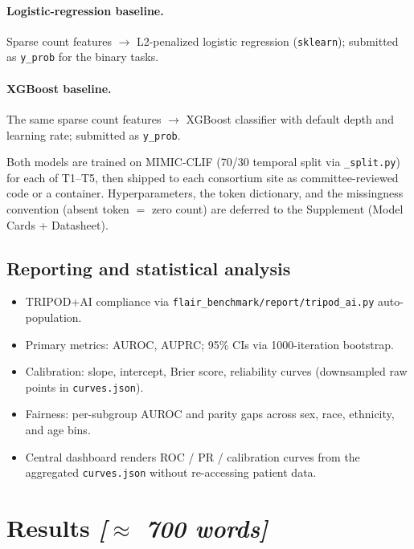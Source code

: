 \documentclass[11pt]{article}
\newcommand{\note}[1]{{\color{notecolor}\textit{[#1]}}}
\begin{document}
\paragraph{Logistic-regression baseline.} Sparse count features $\to$
L2-penalized logistic regression (\texttt{sklearn}); submitted as
\texttt{y\_prob} for the binary tasks.

\paragraph{XGBoost baseline.} The same sparse count features $\to$
XGBoost classifier with default depth and learning rate; submitted as
\texttt{y\_prob}.

Both models are trained on MIMIC-CLIF (70/30 temporal split via
\texttt{\_split.py}) for each of T1--T5, then shipped to each consortium
site as committee-reviewed code or a container. Hyperparameters, the token dictionary, and the missingness
convention (absent token $=$ zero count) are deferred to the Supplement
(Model Cards + Datasheet).

\subsection*{Reporting and statistical analysis}
\begin{itemize}[leftmargin=1.5em]
  \item TRIPOD+AI \citep{collins2024tripodai} compliance via
        \texttt{flair\_benchmark/report/tripod\_ai.py} auto-population.
  \item Primary metrics: AUROC, AUPRC; 95\% CIs via 1000-iteration
        bootstrap.
  \item Calibration: slope, intercept, Brier score, reliability curves
        (downsampled raw points in \texttt{curves.json}).
  \item Fairness: per-subgroup AUROC and parity gaps across sex, race,
        ethnicity, and age bins.
  \item Central dashboard renders ROC / PR / calibration curves from the
        aggregated \texttt{curves.json} without re-accessing patient data.
\end{itemize}

\section{Results \note{$\approx$ 700 words}}
\end{document}
